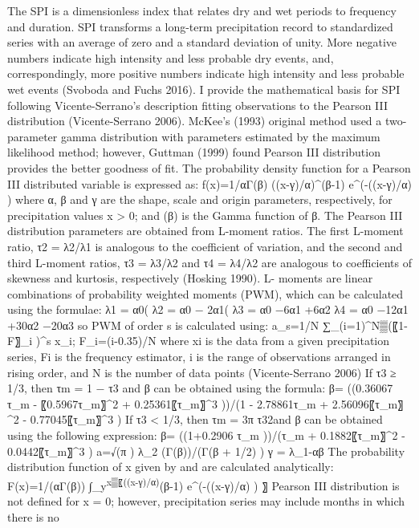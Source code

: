\documentclass[12pt,twoside]{reedthesis}
\theoremstyle{definition}
\theoremstyle{definition}
\theoremstyle{definition}
\theoremstyle{remark}
\begin{document}
The SPI is a dimensionless index that relates dry and wet periods to
frequency and duration. SPI transforms a long-term precipitation record
to standardized series with an average of zero and a standard deviation
of unity. More negative numbers indicate high intensity and less
probable dry events, and, correspondingly, more positive numbers
indicate high intensity and less probable wet events (Svoboda and Fuchs
2016). I provide the mathematical basis for SPI following
Vicente-Serrano's description fitting observations to the Pearson III
distribution (Vicente-Serrano 2006). McKee's (1993) original method used
a two-parameter gamma distribution with parameters estimated by the
maximum likelihood method; however, Guttman (1999) found Pearson III
distribution provides the better goodness of fit. The probability
density function for a Pearson III distributed variable is expressed as:
f(x)=1/αΓ(β) ((x-γ)/α)\^{}(β-1) e\^{}(-((x-γ)/α) ) where α, β and γ are
the shape, scale and origin parameters, respectively, for precipitation
values x \textgreater{} 0; and (β) is the Gamma function of β. The
Pearson III distribution parameters are obtained from L-moment ratios.
The first L-moment ratio, τ2 = λ2/λ1 is analogous to the coefficient of
variation, and the second and third L-moment ratios, τ3 = λ3/λ2 and τ4 =
λ4/λ2 are analogous to coefficients of skewness and kurtosis,
respectively (Hosking 1990). L- moments are linear combinations of
probability weighted moments (PWM), which can be calculated using the
formulae: λ1 = α0( λ2 = α0 − 2α1( λ3 = α0 −6α1 +6α2 λ4 = α0 −12α1 +30α2
−20α3 so PWM of order s is calculated using: a\_s=1/N
∑\_(i=1)\^{}N▒(〖1-F〗\_i )\^{}s x\_i; F\_i=(i-0.35)/N where xi is the
data from a given precipitation series, Fi is the frequency estimator, i
is the range of observations arranged in rising order, and N is the
number of data points (Vicente-Serrano 2006) If τ3 ≥ 1/3, then τm = 1 −
τ3 and β can be obtained using the formula: β= ((0.36067 τ\_m -
〖0.5967τ\_m〗\^{}2 + 0.25361〖τ\_m〗\^{}3 ))/(1 - 2.78861τ\_m +
2.56096〖τ\_m〗\^{}2 - 0.77045〖τ\_m〗\^{}3 ) If τ3 \textless{} 1/3,
then τm = 3π τ32and β can be obtained using the following expression: β=
((1+0.2906 τ\_m ))/(τ\_m + 0.1882〖τ\_m〗\^{}2 - 0.0442〖τ\_m〗\^{}3 )
a=√(π ) λ\_2 (Γ(β))/(Γ(β + 1/2) ) γ = λ\_1-αβ The probability
distribution function of x given by and are calculated analytically:
F(x)=1/(αΓ(β)) ∫\_y\textsuperscript{x▒〖((x-γ)/α)}(β-1) e\^{}(-((x-γ)/α)
) 〗 Pearson III distribution is not defined for x = 0; however,
precipitation series may include months in which there is no
\end{document}
